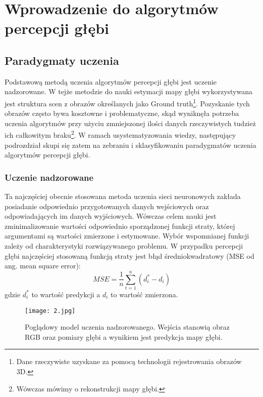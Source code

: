 \chapter{Wprowadzenie do algorytmów percepcji głębi}\label{chap:2_wprowadzenie_do_algorytmów_percepcji_głębi}

\section{Paradygmaty uczenia}
Podstawową metodą uczenia algorytmów percepcji głębi jest uczenie nadzorowane. W tejże metodzie do nauki estymacji mapy głębi wykorzystywana jest struktura scen z obrazów określanych jako Ground truth\footnote{Dane rzeczywiste uzyskane za pomocą technologii rejestrowania obrazów 3D.}. Pozyskanie tych obrazów często bywa kosztowne i problematyczne, skąd wyniknęła potrzeba uczenia algorytmów przy użyciu zmniejszonej ilości danych rzeczywistych tudzież ich całkowitym braku\footnote{Wówczas mówimy o rekonstrukcji mapy głębi.}. W ramach usystematyzowania wiedzy, następujący podrozdział skupi się zatem na zebraniu i sklasyfikowaniu paradygmatów uczenia algorytmów percepcji głębi.

\subsection{Uczenie nadzorowane}
Ta najczęściej obecnie stosowana metoda uczenia sieci neuronowych zakłada posiadanie odpowiednio przygotowanych danych wejściowych oraz odpowiadających im danych wyjściowych. Wówczas celem nauki jest zminimalizowanie wartości odpowiednio sporządzonej funkcji straty, której argumentami są wartości zmierzone i estymowane. Wybór wspomnianej funkcji zależy od charakterystyki rozwiązywanego problemu. W przypadku percepcji głębi najczęściej stosowaną funkcją straty jest błąd średniokwadratowy (MSE od ang. mean square error):
\begin{equation}
MSE = \frac{1}{n} \sum_{t=1}^{n} (d_i^* - d_i)
\end{equation}
gdzie \( d_i^* \) to wartość predykcji a \( d_i \) to wartość zmierzona.
\begin{figure}[H]
    \centering
    \texttt{[image: 2.jpg]}
    \caption{Poglądowy model uczenia nadzorowanego. Wejścia stanowią obraz RGB oraz pomiary głębi a wynikiem jest predykcja mapy głębi.}
    \label{fig:uczenie-nadzorowane}
\end{figure}

